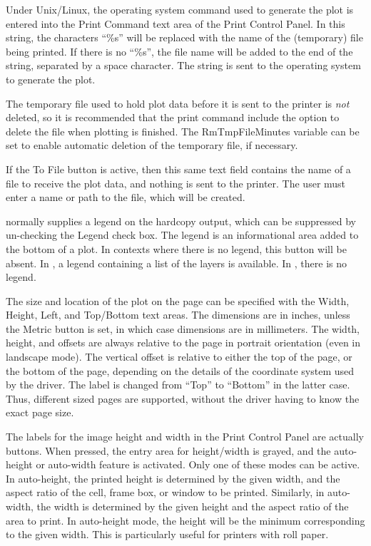 Under Unix/Linux, the operating system command used to generate the
plot is entered into the {\cb Print Command} text area of the {\cb
Print Control Panel}.  In this string, the characters ``{\vt \%s}''
will be replaced with the name of the (temporary) file being printed. 
If there is no ``{\vt \%s}'', the file name will be added to the end
of the string, separated by a space character.  The string is sent to
the operating system to generate the plot.

The temporary file used to hold plot data before it is sent to the
printer is {\it not\/} deleted, so it is recommended that the print
command include the option to delete the file when plotting is
finished.  The {\et RmTmpFileMinutes} variable can be set to enable
automatic deletion of the temporary file, if necessary.

If the {\cb To File} button is active, then this same text field
contains the name of a file to receive the plot data, and nothing is
sent to the printer.  The user must enter a name or path to the file,
which will be created.

{\Xic} normally supplies a legend on the hardcopy output, which can be
suppressed by un-checking the {\cb Legend} check box.  The legend is
an informational area added to the bottom of a plot.  In contexts
where there is no legend, this button will be absent.  In {\Xic}, a
legend containing a list of the layers is available.  In {\WRspice},
there is no legend.

The size and location of the plot on the page can be specified with
the {\cb Width}, {\cb Height}, {\cb Left}, and {\cb Top}/{\cb Bottom}
text areas.  The dimensions are in inches, unless the {\cb Metric}
button is set, in which case dimensions are in millimeters.  The
width, height, and offsets are always relative to the page in portrait
orientation (even in landscape mode).  The vertical offset is relative
to either the top of the page, or the bottom of the page, depending on
the details of the coordinate system used by the driver.  The label is
changed from ``{\vt Top}'' to ``{\vt Bottom}'' in the latter case. 
Thus, different sized pages are supported, without the driver having
to know the exact page size. 

The labels for the image height and width in the {\cb Print Control
Panel} are actually buttons.  When pressed, the entry area for
height/width is grayed, and the auto-height or auto-width feature is
activated.  Only one of these modes can be active.  In auto-height,
the printed height is determined by the given width, and the aspect
ratio of the cell, frame box, or window to be printed.  Similarly, in
auto-width, the width is determined by the given height and the aspect
ratio of the area to print.  In auto-height mode, the height will be
the minimum corresponding to the given width.  This is particularly
useful for printers with roll paper.

